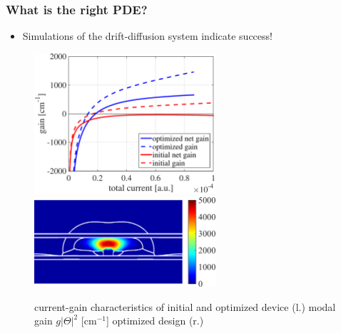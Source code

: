 \documentclass[aspectratio=169,xcolor=dvipsnames,10pt]{beamer}
\begin{document}
\begin{frame}\frametitle{What is the right PDE?}
\begin{example}
\begin{itemize}
\item Simulations of the drift-diffusion system indicate success! 
\end{itemize}
\begin{figure}
\qquad
\includegraphics[height=0.24\textwidth, width=0.6\textwidth, keepaspectratio]{Part I/figures/gain-1.pdf}\qquad
\includegraphics[height=0.24\textwidth, width=0.6\textwidth, keepaspectratio]{Part I/figures/gain_FINAL_new-1.png}%
\caption{
 current-gain characteristics  of initial and optimized device (l.) modal gain $g|\Theta|^2$ [cm$^{-1}$] optimized design (r.)}
\label{fig:gainsimulation}
\end{figure}
\end{example}
\end{frame}
\end{document}
